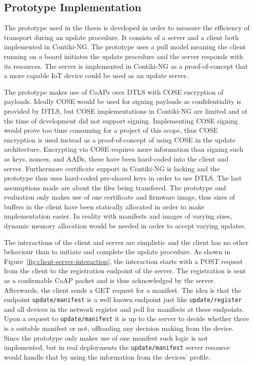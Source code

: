 \documentclass[0-thesis.tex]{subfiles}
\begin{document}
\subsection{Prototype Implementation}
\label{ssec:prototype-implementation}
The prototype used in the thesis is developed in order to measure the efficiency of
transport during an update procedure. It consists of a server and a client both
implemented in Contiki-NG. The prototype uses a pull model meaning the client running on a
board initiates the update procedure and the server responds with its resources. The
server is implemented in Contiki-NG as a proof-of-concept that a more capable IoT device
could be used as an update server.

The prototype makes use of CoAPs over DTLS with COSE encryption of payloads. Ideally COSE
would be used for signing payloads as confidentiality is provided by DTLS, but COSE
implementations in Contiki-NG are limited and at the time of development did not support
signing. Implementing COSE signing would prove too time consuming for a project of this
scope, thus COSE encryption is used instead as a proof-of-concept of using COSE in the
update architecture. Encrypting via COSE requires more information than signing such as
keys, nonces, and AADs, these have been hard-coded into the client and server. Furthermore
certificate support in Contiki-NG is lacking and the prototype thus uses hard-coded
pre-shared keys in order to use DTLS. The last assumptions made are about the files being
transfered. The prototype and evaluation only makes use of one certificate and firmware
image, thus sizes of buffers in the client have been statically allocated in order to make
implementation easier. In reality with manifests and images of varying sizes, dynamic
memory allocation would be needed in order to accept varying updates.

The interactions of the client and server are simplistic and the client has no other
behaviour than to initiate and complete the update procedure. As shown in
Figure~\ref{fig:client-server-interaction}, the interaction starts with a POST request
from the client to the registration endpoint of the server. The registration is sent as a
confirmable CoAP packet and is thus acknowledged by the server. Afterwards, the client
sends a GET request for a manifest. The idea is that the endpoint \texttt{update/manifest}
is a well known endpoint just like \texttt{update/register} and all devices in the network
register and poll for manifests at these endpoints. Upon a request to
\texttt{update/manifest} it is up to the server to decide whether there is a suitable
manifest or not, offloading any decision making from the device. Since the prototype only
makes use of one manifest such logic is not implemented, but in real deployments the
\texttt{update/manifest} server resource would handle that by using the information from
the devices' profile.
\end{document}
